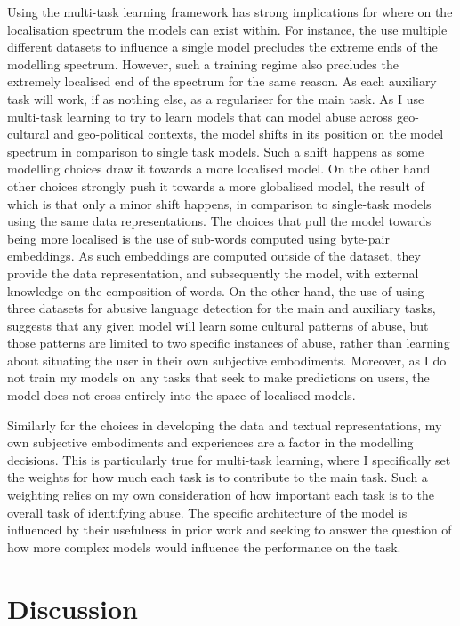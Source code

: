 {%
Using the multi-task learning framework has strong implications for where on the localisation spectrum the models can exist within. For instance, the use multiple different datasets to influence a single model precludes the extreme ends of the modelling spectrum. However, such a training regime also precludes the extremely localised end of the spectrum for the same reason. As each auxiliary task will work, if as nothing else, as a regulariser for the main task.
As I use multi-task learning to try to learn models that can model abuse across geo-cultural and geo-political contexts, the model shifts in its position on the model spectrum in comparison to single task models. Such a shift happens as some modelling choices draw it towards a more localised model. On the other hand other choices strongly push it towards a more globalised model, the result of which is that only a minor shift happens, in comparison to single-task models using the same data representations. The choices that pull the model towards being more localised is the use of sub-words computed using byte-pair embeddings. As such embeddings are computed outside of the dataset, they provide the data representation, and subsequently the model, with external knowledge on the composition of words. On the other hand, the use of using three datasets for abusive language detection for the main and auxiliary tasks, suggests that any given model will learn some cultural patterns of abuse, but those patterns are limited to two specific instances of abuse, rather than learning about situating the user in their own subjective embodiments. Moreover, as I do not train my models on any tasks that seek to make predictions on users, the model does not cross entirely into the space of localised models.

Similarly for the choices in developing the data and textual representations, my own subjective embodiments and experiences are a factor in the modelling decisions. This is particularly true for multi-task learning, where I specifically set the weights for how much each task is to contribute to the main task. Such a weighting relies on my own consideration of how important each task is to the overall task of identifying abuse. The specific architecture of the model is influenced by their usefulness in prior work \citep{Bingel:2018} and seeking to answer the question of how more complex models would influence the performance on the task.
}

\section{Discussion}

